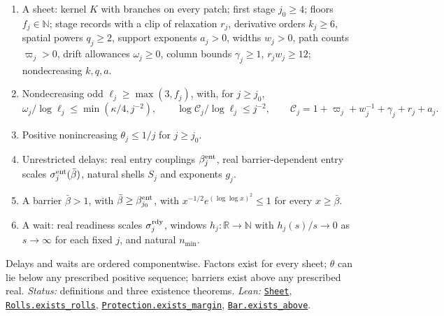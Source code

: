 \documentclass[
  letterpaper,
  11pt]{article}
\providecommand{\tightlist}{%
  \setlength{\itemsep}{0pt}\setlength{\parskip}{0pt}}
\begin{document}
\begin{enumerate}
\def\labelenumi{\arabic{enumi}.}
\tightlist
\item
  A sheet: kernel \(K\) with branches on every patch; first stage
  \(j_0\ge4\); floors \(f_j\in\mathbb N\); stage records with a clip of
  relaxation \(r_j\), derivative orders \(k_j\ge6\), spatial powers
  \(q_j\ge2\), support exponents \(a_j>0\), widths \(w_j>0\), path
  counts \(\varpi_j>0\), drift allowances \(\omega_j\ge0\), column
  bounds \(\gamma_j\ge1\), \(r_jw_j\ge12\); nondecreasing \(k,q,a\).
\item
  Nondecreasing odd \(\ell_j\ge\max(3,f_j)\), with, for \(j\ge j_0\),
  \[\omega_j/\log\ell_j\le\min(\kappa/4,j^{-2}),\qquad\log\mathcal C_j/\log\ell_j\le j^{-2},\qquad\mathcal C_j=1+\varpi_j+w_j^{-1}+\gamma_j+r_j+a_j.\]
\item
  Positive nonincreasing \(\theta_j\le1/j\) for \(j\ge j_0\).
\item
  Unrestricted delays: real entry couplings \(\beta^{\rm ent}_j\), real
  barrier-dependent entry scales \(\sigma^{\rm ent}_j(\bar\beta)\),
  natural shells \(S_j\) and exponents \(g_j\).
\item
  A barrier \(\bar\beta>1\), with \(\bar\beta\ge\beta^{\rm ent}_{j_0}\),
  with \(x^{-1/2}e^{(\log\log x)^2}\le1\) for every \(x\ge\bar\beta\).
\item
  A wait: real readiness scales \(\sigma^{\rm rdy}_j\), windows
  \(h_j:\mathbb R\to\mathbb N\) with \(h_j(s)/s\to0\) as \(s\to\infty\)
  for each fixed \(j\), and natural \(n_{\min}\).
\end{enumerate}

Delays and waits are ordered componentwise. Factors exist for every
sheet; \(\theta\) can lie below any prescribed positive sequence;
barriers exist above any prescribed real. \emph{Status:} definitions and
three existence theorems. \emph{Lean:}
\href{https://github.com/yang-mills-group/OpenAI-YM-20261028/blob/3456e5e75cf8d4cd558955a5c7638fba2d68f464/YM/Price/Intent.lean\#L26-L35}{\texttt{Sheet}},
\href{https://github.com/yang-mills-group/OpenAI-YM-20261028/blob/3456e5e75cf8d4cd558955a5c7638fba2d68f464/YM/Price/Intent.lean\#L79-L84}{\texttt{Rolls.exists\_rolls}},
\href{https://github.com/yang-mills-group/OpenAI-YM-20261028/blob/3456e5e75cf8d4cd558955a5c7638fba2d68f464/YM/Price/Intent.lean\#L98-L111}{\texttt{Protection.exists\_margin}},
\href{https://github.com/yang-mills-group/OpenAI-YM-20261028/blob/3456e5e75cf8d4cd558955a5c7638fba2d68f464/YM/Price/Length.lean\#L19-L37}{\texttt{Bar.exists\_above}}.
\end{document}
